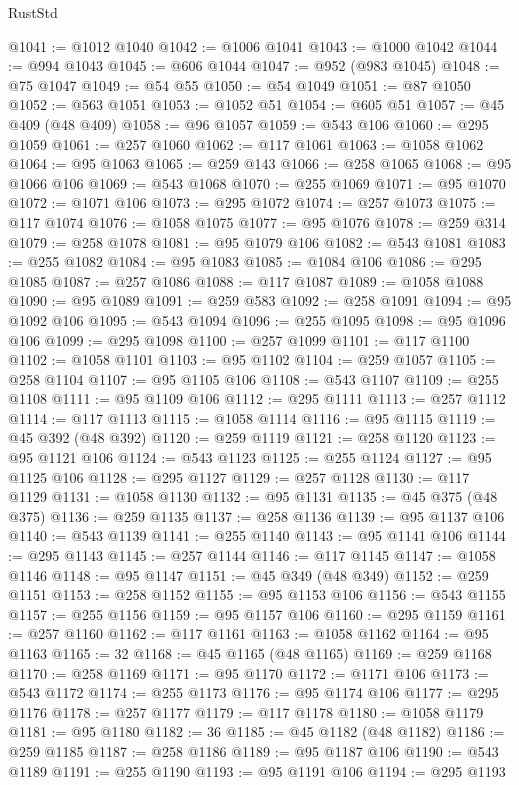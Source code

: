 \begin{lexlean}{RustStd}
\begin{coremodule}
@1041 := @1012 @1040
@1042 := @1006 @1041
@1043 := @1000 @1042
@1044 := @994 @1043
@1045 := @606 @1044
@1047 := @952 (@983 @1045)
@1048 := @75 @1047
@1049 := @54 @55
@1050 := @54 @1049
@1051 := @87 @1050
@1052 := @563 @1051
@1053 := @1052 @51
@1054 := @605 @51
@1057 := @45 @409 (@48 @409)
@1058 := @96 @1057
@1059 := @543 @106
@1060 := @295 @1059
@1061 := @257 @1060
@1062 := @117 @1061
@1063 := @1058 @1062
@1064 := @95 @1063
@1065 := @259 @143
@1066 := @258 @1065
@1068 := @95 @1066 @106
@1069 := @543 @1068
@1070 := @255 @1069
@1071 := @95 @1070
@1072 := @1071 @106
@1073 := @295 @1072
@1074 := @257 @1073
@1075 := @117 @1074
@1076 := @1058 @1075
@1077 := @95 @1076
@1078 := @259 @314
@1079 := @258 @1078
@1081 := @95 @1079 @106
@1082 := @543 @1081
@1083 := @255 @1082
@1084 := @95 @1083
@1085 := @1084 @106
@1086 := @295 @1085
@1087 := @257 @1086
@1088 := @117 @1087
@1089 := @1058 @1088
@1090 := @95 @1089
@1091 := @259 @583
@1092 := @258 @1091
@1094 := @95 @1092 @106
@1095 := @543 @1094
@1096 := @255 @1095
@1098 := @95 @1096 @106
@1099 := @295 @1098
@1100 := @257 @1099
@1101 := @117 @1100
@1102 := @1058 @1101
@1103 := @95 @1102
@1104 := @259 @1057
@1105 := @258 @1104
@1107 := @95 @1105 @106
@1108 := @543 @1107
@1109 := @255 @1108
@1111 := @95 @1109 @106
@1112 := @295 @1111
@1113 := @257 @1112
@1114 := @117 @1113
@1115 := @1058 @1114
@1116 := @95 @1115
@1119 := @45 @392 (@48 @392)
@1120 := @259 @1119
@1121 := @258 @1120
@1123 := @95 @1121 @106
@1124 := @543 @1123
@1125 := @255 @1124
@1127 := @95 @1125 @106
@1128 := @295 @1127
@1129 := @257 @1128
@1130 := @117 @1129
@1131 := @1058 @1130
@1132 := @95 @1131
@1135 := @45 @375 (@48 @375)
@1136 := @259 @1135
@1137 := @258 @1136
@1139 := @95 @1137 @106
@1140 := @543 @1139
@1141 := @255 @1140
@1143 := @95 @1141 @106
@1144 := @295 @1143
@1145 := @257 @1144
@1146 := @117 @1145
@1147 := @1058 @1146
@1148 := @95 @1147
@1151 := @45 @349 (@48 @349)
@1152 := @259 @1151
@1153 := @258 @1152
@1155 := @95 @1153 @106
@1156 := @543 @1155
@1157 := @255 @1156
@1159 := @95 @1157 @106
@1160 := @295 @1159
@1161 := @257 @1160
@1162 := @117 @1161
@1163 := @1058 @1162
@1164 := @95 @1163
@1165 := 32
@1168 := @45 @1165 (@48 @1165)
@1169 := @259 @1168
@1170 := @258 @1169
@1171 := @95 @1170
@1172 := @1171 @106
@1173 := @543 @1172
@1174 := @255 @1173
@1176 := @95 @1174 @106
@1177 := @295 @1176
@1178 := @257 @1177
@1179 := @117 @1178
@1180 := @1058 @1179
@1181 := @95 @1180
@1182 := 36
@1185 := @45 @1182 (@48 @1182)
@1186 := @259 @1185
@1187 := @258 @1186
@1189 := @95 @1187 @106
@1190 := @543 @1189
@1191 := @255 @1190
@1193 := @95 @1191 @106
@1194 := @295 @1193

\end{coremodule}
\end{lexlean}
